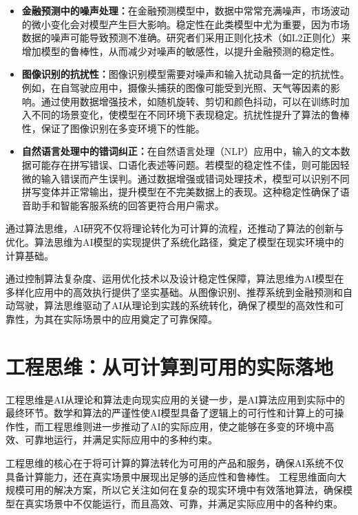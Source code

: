 \begin{itemize}
\item {\bf 金融预测中的噪声处理：}在金融预测模型中，数据中常常充满噪声，市场波动的微小变化会对模型产生巨大影响。稳定性在此类模型中尤为重要，因为市场数据的噪声可能导致预测不准确。研究者们采用正则化技术（如L2正则化）来增加模型的鲁棒性，从而减少对噪声的敏感性，以提升金融预测的稳定性。

\item {\bf 图像识别的抗扰性：}图像识别模型需要对噪声和输入扰动具备一定的抗扰性。例如，在自驾驶应用中，摄像头捕获的图像可能受到光照、天气等因素的影响。通过使用数据增强技术，如随机旋转、剪切和颜色抖动，可以在训练时加入不同的场景变化，使模型在不同环境下表现稳定。抗扰性提升了算法的鲁棒性，保证了图像识别在多变环境下的性能。

\item {\bf 自然语言处理中的错词纠正：}在自然语言处理（NLP）应用中，输入的文本数据可能存在拼写错误、口语化表述等问题。若模型的稳定性不佳，则可能因轻微的输入错误而产生误判。通过数据增强或错词处理技术，模型可以识别不同拼写变体并正常输出，提升模型在不完美数据上的表现。这种稳定性确保了语音助手和智能客服系统的回答更符合用户需求。

\end{itemize}

通过算法思维，AI研究不仅将理论转化为可计算的流程，还推动了算法的创新与优化。算法思维为AI模型的实现提供了系统化路径，奠定了模型在现实环境中的计算基础。

通过控制算法复杂度、运用优化技术以及设计稳定性保障，算法思维为AI模型在多样化应用中的高效执行提供了坚实基础。从图像识别、推荐系统到金融预测和自动驾驶，算法思维驱动了AI从理论到实践的系统转化，确保了模型的高效性和可靠性，为其在实际场景中的应用奠定了可靠保障。

\section{工程思维：从可计算到可用的实际落地}
工程思维是AI从理论和算法走向现实应用的关键一步，是AI算法应用到实际中的最终环节。数学和算法的严谨性使AI模型具备了逻辑上的可行性和计算上的可操作性，而工程思维则进一步推动了AI的实际应用，使之能够在多变的环境中高效、可靠地运行，并满足实际应用中的多种约束。

工程思维的核心在于将可计算的算法转化为可用的产品和服务，确保AI系统不仅具备计算能力，还在真实场景中展现出足够的适应性和鲁棒性。
工程思维面向大规模可用的解决方案，所以它关注如何在复杂的现实环境中有效落地算法，确保模型在真实场景中不仅能运行，而且高效、可靠，并满足实际应用中的各种约束。

